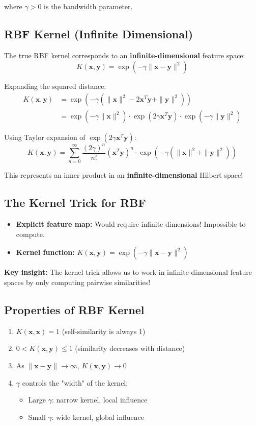 \documentclass{tufte-handout}
\begin{document}
where $\gamma > 0$ is the bandwidth parameter.

\subsection{RBF Kernel (Infinite Dimensional)}
The true RBF kernel corresponds to an \textbf{infinite-dimensional} feature space:
\[
K(\mathbf{x}, \mathbf{y}) = \exp\left(-\gamma \|\mathbf{x} - \mathbf{y}\|^2\right)
\]

Expanding the squared distance:
\begin{align}
K(\mathbf{x}, \mathbf{y}) &= \exp\left(-\gamma (\|\mathbf{x}\|^2 - 2\mathbf{x}^T\mathbf{y} + \|\mathbf{y}\|^2)\right) \\
&= \exp(-\gamma \|\mathbf{x}\|^2) \cdot \exp(2\gamma \mathbf{x}^T\mathbf{y}) \cdot \exp(-\gamma \|\mathbf{y}\|^2)
\end{align}

Using Taylor expansion of $\exp(2\gamma \mathbf{x}^T\mathbf{y})$:
\[
K(\mathbf{x}, \mathbf{y}) = \sum_{n=0}^{\infty} \frac{(2\gamma)^n}{n!} (\mathbf{x}^T\mathbf{y})^n 
\cdot \exp(-\gamma(\|\mathbf{x}\|^2 + \|\mathbf{y}\|^2))
\]

This represents an inner product in an \textbf{infinite-dimensional} Hilbert space!

\subsection{The Kernel Trick for RBF}
\begin{itemize}
    \item \textbf{Explicit feature map:} Would require infinite dimensions! Impossible to compute.
    \item \textbf{Kernel function:} $K(\mathbf{x}, \mathbf{y}) = \exp(-\gamma \|\mathbf{x} - \mathbf{y}\|^2)$ 
\end{itemize}

\textbf{Key insight:} The kernel trick allows us to work in infinite-dimensional 
feature spaces by only computing pairwise similarities!

\subsection{Properties of RBF Kernel}
\begin{enumerate}
    \item $K(\mathbf{x}, \mathbf{x}) = 1$ (self-similarity is always 1)
    \item $0 < K(\mathbf{x}, \mathbf{y}) \leq 1$ (similarity decreases with distance)
    \item As $\|\mathbf{x} - \mathbf{y}\| \to \infty$, $K(\mathbf{x}, \mathbf{y}) \to 0$
    \item $\gamma$ controls the "width" of the kernel:
    \begin{itemize}
        \item Large $\gamma$: narrow kernel, local influence
        \item Small $\gamma$: wide kernel, global influence
    \end{itemize}
\end{enumerate}
\end{document}
